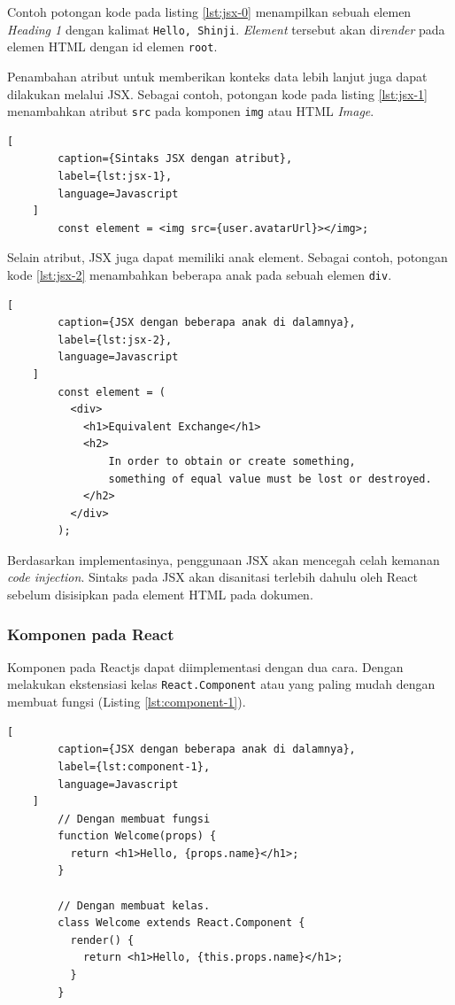     Contoh potongan kode pada listing \ref{lst:jsx-0} menampilkan sebuah elemen
    \textit{Heading 1} dengan kalimat \texttt{Hello, Shinji}. \textit{Element} tersebut
    akan di\textit{render} pada elemen HTML dengan id elemen \texttt{root}.
    
    Penambahan atribut untuk memberikan konteks data lebih lanjut juga dapat
    dilakukan melalui JSX. Sebagai contoh, potongan kode pada listing
    \ref{lst:jsx-1} menambahkan atribut \texttt{src} pada komponen \texttt{img}
    atau HTML \textit{Image}.
    
    \begin{lstlisting}[
        caption={Sintaks JSX dengan atribut}, 
        label={lst:jsx-1}, 
        language=Javascript
    ]
        const element = <img src={user.avatarUrl}></img>;
    \end{lstlisting}
    
        
    Selain atribut, JSX juga dapat memiliki anak element. Sebagai contoh,
    potongan kode \ref{lst:jsx-2} menambahkan beberapa anak pada sebuah elemen
    \texttt{div}.
    \begin{lstlisting}[
        caption={JSX dengan beberapa anak di dalamnya}, 
        label={lst:jsx-2}, 
        language=Javascript
    ]
        const element = (
          <div>
            <h1>Equivalent Exchange</h1>
            <h2>
                In order to obtain or create something,
                something of equal value must be lost or destroyed.
            </h2>
          </div>
        );
    \end{lstlisting}
    
    Berdasarkan implementasinya, penggunaan JSX akan mencegah celah kemanan
    \textit{code injection}. Sintaks pada JSX akan disanitasi terlebih dahulu
    oleh React sebelum disisipkan pada element HTML pada dokumen.
    
    \subsubsection{Komponen pada React}
    Komponen pada Reactjs dapat diimplementasi dengan dua cara. Dengan melakukan
    ekstensiasi kelas \texttt{React.Component} atau yang paling mudah dengan
    membuat fungsi (Listing \ref{lst:component-1}).
    
    \begin{lstlisting}[
        caption={JSX dengan beberapa anak di dalamnya}, 
        label={lst:component-1}, 
        language=Javascript
    ]
        // Dengan membuat fungsi
        function Welcome(props) {
          return <h1>Hello, {props.name}</h1>;
        }
        
        // Dengan membuat kelas.
        class Welcome extends React.Component {
          render() {
            return <h1>Hello, {this.props.name}</h1>;
          }
        }
    \end{lstlisting}
    
